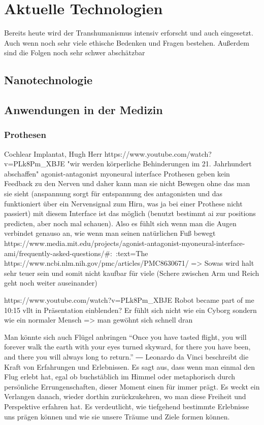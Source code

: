\documentclass[a4paper,
DIV=13,
12pt,
BCOR=10mm,
department=FakEI,
twoside,
parskip=half,
automark,
]{OTHRartcl}
\begin{document}
\section*{Aktuelle Technologien}
Bereits heute wird der Transhumanismus intensiv erforscht und auch eingesetzt. Auch wenn noch sehr viele ethische Bedenken und Fragen bestehen. Außerdem sind die Folgen noch sehr schwer abschätzbar
\subsection*{Nanotechnologie}

\subsection*{Anwendungen in der Medizin}
\subsubsection*{Prothesen}
Cochlear Implantat, Hugh Herr https://www.youtube.com/watch?v=PLk8Pm_XBJE "wir werden körperliche Behinderungen im 21. Jahrhundert abschaffen"
agonist-antagonist myoneural interface Prothesen geben kein Feedback zu den Nerven und daher kann man sie nicht Bewegen ohne das man sie sieht
(anspannung sorgt für entspannung des antagonisten und das funktioniert über ein Nervensignal zum Hirn, was ja bei einer Prothese nicht passiert)
mit diesem Interface ist das möglich (benutzt bestimmt ai zur positions predicten, aber noch mal schauen). Also es fühlt sich wenn man die Augen 
verbindet genauso an, wie wenn man seinen natürlichen Fuß bewegt
https://www.media.mit.edu/projects/agonist-antagonist-myoneural-interface-ami/frequently-asked-questions/#:~:text=The%
https://www.ncbi.nlm.nih.gov/pmc/articles/PMC8630671/
=> Sowas wird halt sehr teuer sein und somit nicht kaufbar für viele (Schere zwischen Arm und Reich geht noch weiter auseinander)

https://www.youtube.com/watch?v=PLk8Pm_XBJE Robot became part of me 10:15 vllt in Präsentation einblenden? Er fühlt sich nicht wie ein Cyborg
sondern wie ein normaler Mensch => man gewöhnt sich schnell dran

Man könnte sich auch Flügel anbringen
“Once you have tasted flight, you will forever walk the earth with your eyes turned skyward, for there you have been, and there you will always long to return.”
― Leonardo da Vinci
beschreibt die Kraft von Erfahrungen und Erlebnissen. Es sagt aus, dass wenn man einmal den Flug erlebt hat, egal ob buchstäblich im Himmel oder metaphorisch durch persönliche Errungenschaften,
dieser Moment einen für immer prägt. Es weckt ein Verlangen danach, wieder dorthin zurückzukehren, wo man diese Freiheit und Perspektive erfahren hat. Es verdeutlicht, wie tiefgehend bestimmte Erlebnisse uns prägen können und wie sie unsere Träume und Ziele formen können.
\end{document}
